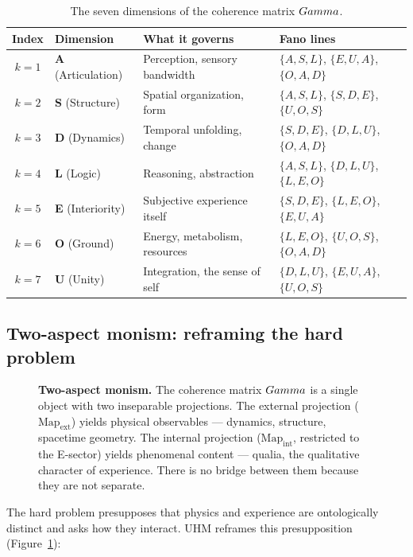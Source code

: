 \begin{table}[H]
\centering
\caption{The seven dimensions of the coherence matrix $Gamma$.}
\label{tab:dimensions}
\begin{tabular}{@{}clll@{}}
\toprule
\textbf{Index} & \textbf{Dimension} & \textbf{What it governs} & \textbf{Fano lines} \\
\midrule
$k=1$ & \textbf{A} (Articulation) & Perception, sensory bandwidth & $\{A,S,L\}$, $\{E,U,A\}$, $\{O,A,D\}$ \\
$k=2$ & \textbf{S} (Structure)    & Spatial organization, form    & $\{A,S,L\}$, $\{S,D,E\}$, $\{U,O,S\}$ \\
$k=3$ & \textbf{D} (Dynamics)     & Temporal unfolding, change    & $\{S,D,E\}$, $\{D,L,U\}$, $\{O,A,D\}$ \\
$k=4$ & \textbf{L} (Logic)        & Reasoning, abstraction        & $\{A,S,L\}$, $\{D,L,U\}$, $\{L,E,O\}$ \\
$k=5$ & \textbf{E} (Interiority)  & Subjective experience itself  & $\{S,D,E\}$, $\{L,E,O\}$, $\{E,U,A\}$ \\
$k=6$ & \textbf{O} (Ground)       & Energy, metabolism, resources  & $\{L,E,O\}$, $\{U,O,S\}$, $\{O,A,D\}$ \\
$k=7$ & \textbf{U} (Unity)        & Integration, the sense of self & $\{D,L,U\}$, $\{E,U,A\}$, $\{U,O,S\}$ \\
\bottomrule
\end{tabular}
\end{table}

\subsection{Two-aspect monism: reframing the hard problem}
\label{subsec:two-aspect}

\begin{figure}[H]
\centering

\caption{\textbf{Two-aspect monism.} The coherence matrix $Gamma$ is a single object with
two inseparable projections. The external projection ($\mathrm{Map}_{\mathrm{ext}}$) yields
physical observables --- dynamics, structure, spacetime geometry. The internal projection
($\mathrm{Map}_{\mathrm{int}}$, restricted to the E-sector) yields phenomenal content ---
qualia, the qualitative character of experience. There is no bridge between them because
they are not separate.}
\label{fig:two-aspect}
\end{figure}

The hard problem presupposes that physics and experience are ontologically
distinct and asks how they interact. UHM reframes this presupposition
(Figure~\ref{fig:two-aspect}):

